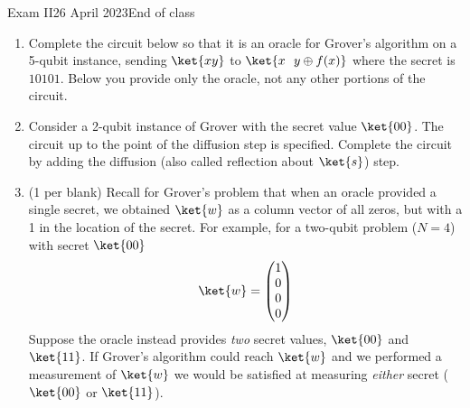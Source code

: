 \documentclass[12pt]{article}
\begin{document}
\begin{assignment}{Exam II}{26 April 2023}{End of class}
\begin{enumerate}
\clearpage\item{}
Complete the circuit below so that it is an oracle for Grover's algorithm on a 5-qubit instance, sending $\ket{xy}$ to $\ket{x\ \  y\oplus f(x)}$ where the secret is $10101$.  Below you provide only the oracle, not any other portions of the circuit.


\item{}
Consider a 2-qubit instance of Grover with the secret value $\ket{00}$.  The circuit up to the point of the diffusion step is specified.  Complete the circuit by adding the diffusion (also called reflection about $\ket{s}$) step.


\clearpage\item{} (1 per blank)
Recall for Grover's problem that when an oracle provided a single secret, we obtained $\ket{w}$ as a column vector of all zeros, but with a 1 in the location of the secret.   For example, for a two-qubit problem ($N=4$) with secret $\ket{00}$ 
\[ \ket{w} = \begin{pmatrix} 1 \\ 0 \\ 0 \\ 0\end{pmatrix} \]
Suppose the oracle instead provides \emph{two} secret values, $\ket{00}$ and $\ket{11}$.  If Grover's algorithm could reach $\ket{w}$ and we performed a measurement of $\ket{w}$ we would be satisfied at measuring \emph{either} secret ($\ket{00}$ or $\ket{11}$).


\end{enumerate}
\end{assignment}
\end{document}
